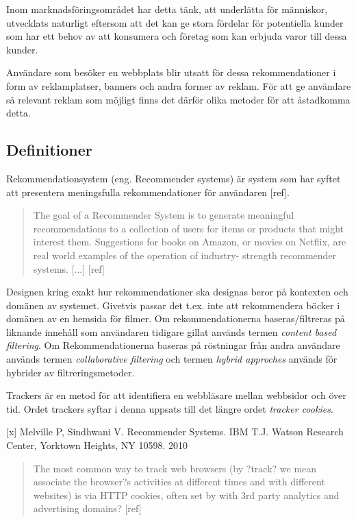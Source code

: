 \documentclass[a4paper,11pt]{article}
\begin{document}
{Inom marknadsföringsområdet har detta tänk, att underlätta för människor, utvecklats naturligt eftersom att det kan ge stora fördelar för potentiella kunder som har ett behov av att konsumera och företag som kan erbjuda varor till dessa kunder.


Användare som besöker en webbplats blir utsatt för dessa rekommendationer i form av reklamplatser, banners och andra former av reklam. För att ge användare så relevant reklam som möjligt finns det därför olika metoder för att åstadkomma detta.

\subsection{Definitioner}
Rekommendationsystem (eng. Recommender systems) är system som har syftet att presentera meningsfulla rekommendationer för användaren [ref].

\begin{quote}
The goal of a Recommender System is to generate meaningful recommendations to a collection of users for items or products that might interest them. Suggestions for books on Amazon, or movies on Netflix, are real world examples of the operation of industry- strength recommender systems. [...]  [ref]
\end{quote}
Designen kring exakt hur rekommendationer ska designas beror på kontexten och domänen av systemet. Givetvis passar det t.ex. inte att rekommendera böcker i domänen av en hemsida för filmer. Om rekommendationerna baseras/filtreras på liknande innehåll som användaren tidigare gillat används termen \textit{content based filtering}. Om Rekommendationerna baseras på röstningar från andra användare används termen \textit{collaborative filtering} och termen \textit{hybrid approches} används för hybrider av filtreringsmetoder.

Trackers är en metod för att identifiera en webbläsare mellan webbsidor och över tid. Ordet trackers syftar i denna uppsats till det längre ordet \textit{tracker cookies}.

[x] Melville P, Sindhwani V. Recommender Systems. IBM T.J. Watson Research Center, Yorktown Heights, NY 10598. 2010

\begin{quote}
The most common way to track web browsers (by ?track? we mean associate the browser?s activities at different times and with different websites) is via HTTP cookies, often set by with 3rd party analytics and advertising domains? [ref]
\end{quote}

}
\end{document}
